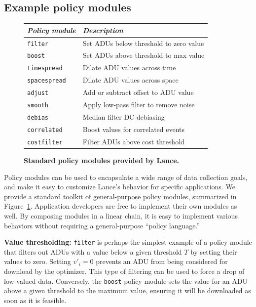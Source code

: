 \documentclass[lettersize]{sig-alternate-konrad}
\begin{document}
\subsection{Example policy modules}
\label{sec-example-policies}

\begin{figure}[t]
\begin{center}
\begin{small}
\begin{tabular}{|l|l|} \hline
{\em Policy module} & {\em Description} \\ \hline
{\tt filter} & Set ADUs below threshold to zero value \\
{\tt boost} & Set ADUs above threshold to max value \\
{\tt timespread} & Dilate ADU values across time \\
{\tt spacespread} & Dilate ADU values across space \\
{\tt adjust} & Add or subtract offset to ADU value \\
{\tt smooth} & Apply low-pass filter to remove noise \\
{\tt debias} & Median filter DC debiasing \\
{\tt correlated} & Boost values for correlated events \\
{\tt costfilter} & Filter ADUs above cost threshold \\ \hline
\end{tabular}
\end{small}
\end{center}
\caption{\small {\bf Standard policy modules provided by Lance.}}
\vspace{-0.2in}
\label{fig-policymodules}
\end{figure}

Policy modules can be used to encapsulate a wide range of 
data collection goals, and make it easy to customize Lance's behavior
for specific applications. We provide a standard toolkit of
general-purpose policy modules, summarized in Figure~\ref{fig-policymodules}.
Application developers are free to implement their own modules as well.
By composing modules in a linear chain, it is easy to implement 
various behaviors without requiring a general-purpose ``policy language.'' 

{\bf Value thresholding:}
{\tt filter} is perhaps the simplest example of a policy module that 
filters out ADUs with a value below a given threshold $T$ by
setting their values to zero.
Setting $v'_i = 0$ prevents an ADU from being considered for download by the
optimizer.  This type of filtering can be used to force a drop of low-valued
data. Conversely, the {\tt boost} policy module sets the value for an ADU
above a given threshold to the maximum value, ensuring it will be downloaded
as soon as it is feasible.
\end{document}
